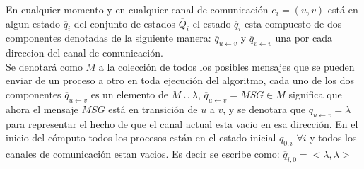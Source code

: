 \documentclass[10pt]{report}
\begin{document}
    En cualquier momento y en cualquier canal de comunicación $e_{i}=(u,v)$ está en algun estado
    $\overline{q}_{i}$ del conjunto de estados $\overline{Q}_{i}$
    el estado $\overline{q}_{i}$ esta compuesto de dos componentes denotadas de la siguiente manera:
    $\overline{q}_{u\leftarrow v}$ y $\overline{q}_{v\leftarrow v}$ una por cada direccion del canal
    de comunicación.\newline
    \\
    Se denotará como $M$ a la colección de todos los posibles mensajes que se pueden enviar de un proceso a otro en toda ejecución del algoritmo,
    \space cada uno de los dos componentes $\overline{q}_{u \leftarrow v}$ es un elemento de $M \cup \lambda$,
    $\overline{q}_{u\leftarrow v} = MSG\in M$ significa que ahora el mensaje $MSG$ está en transición de
    $u$ a $v$, y se denotara que $\overline{q}_{u\leftarrow v} = \lambda$ para representar el hecho de que
    el canal actual esta vacio en esa dirección.
    En el inicio del cómputo todos los procesos están en el estado inicial $q_{0,i}$ $\forall i$
    y todos los canales de comunicación estan vacios.
    Es decir se escribe como: $\overline{q}_{i,0} = <\lambda,\lambda>$
    \newline
\end{document}
